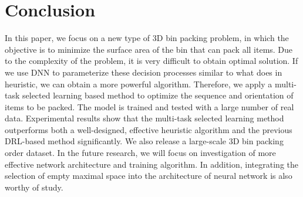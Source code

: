 \section{Conclusion}
\label{sec:conclusion}

In this paper, we focus on a new type of 3D bin packing problem, 
in which the objective is to minimize the surface area of the bin 
that can pack all items. Due to the complexity of the problem, 
it is very difficult to obtain optimal solution. If we use DNN to parameterize these decision processes similar to what does in heuristic, we can obtain a more powerful algorithm. %
Therefore, we apply a multi-task 
selected learning based method to optimize the sequence and orientation of 
items to be packed. The model is trained and tested with a large number of real data. 
Experimental results show that the multi-task selected learning method outperforms 
both a well-designed, effective heuristic algorithm and the previous DRL-based 
method significantly. We also release a large-scale 3D bin packing order
dataset. 
In the future research, we will focus on investigation of more effective network architecture and training algorithm. In addition, integrating the selection of empty maximal space into the architecture of neural network is also worthy of study.
